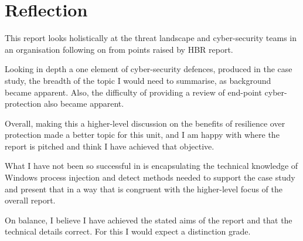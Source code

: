 \section{Reflection}


This report looks holistically at the threat landscape and cyber-security teams in an organisation following on from points raised by HBR report. 

Looking in depth a one element of cyber-security defences, produced in the case study, the breadth of the topic I would need to summarise, as
background became apparent.  Also, the difficulty of providing a review of end-point cyber-protection also became apparent. 
  
Overall, making this a higher-level discussion on the benefits of resilience over protection made a better topic for this unit, and I am happy
with where the report is pitched and think I have achieved that objective. 

What I have not been so successful in is encapsulating the technical knowledge of Windows process injection and detect methods needed to
support the case study and present that in a way that is congruent with the higher-level focus of the overall report.

On balance, I believe I have achieved the stated aims of the report and that the technical details correct.  For this I would expect a distinction grade.
